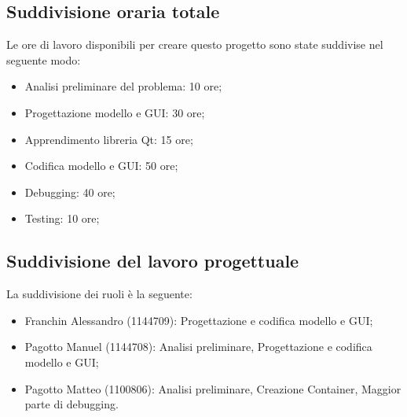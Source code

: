 \documentclass[../relazione.tex]{subfiles}
\begin{document}
\subsection{Suddivisione oraria totale}
\label{ssec:suddivisione-oraria}
Le ore di lavoro disponibili per creare questo progetto sono state suddivise nel seguente modo:
\begin{itemize}
\item Analisi preliminare del problema: 10 ore;
\item Progettazione modello e GUI: 30 ore;
\item Apprendimento libreria Qt: 15 ore;
\item Codifica modello e GUI: 50 ore;
\item Debugging: 40 ore;
\item Testing: 10 ore;
\end{itemize}

\subsection{Suddivisione del lavoro progettuale}
\label{ssec:suddivisione-del-lavoro-progettuale}
La suddivisione dei ruoli è la seguente:
\begin{itemize}
    \item Franchin Alessandro (1144709): Progettazione e codifica modello e GUI;
    \item Pagotto Manuel (1144708): Analisi preliminare, Progettazione e codifica modello e GUI;
    \item Pagotto Matteo (1100806): Analisi preliminare, Creazione Container, Maggior parte di debugging.
\end{itemize}
\end{document}
